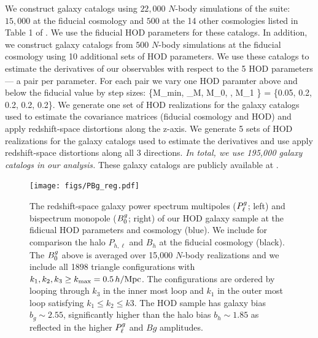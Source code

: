 We construct galaxy catalogs using $22,000$ $N$-body simulations of the \quij
suite: $15,000$ at the fiducial cosmology and $500$ at the 14 other cosmologies
listed in Table 1 of \cite{hahn2019}. We use the fiducial HOD parameters for
these catalogs. In addition, we construct galaxy catalogs from $500$ $N$-body
simulations at the fiducial cosmology using 10 additional sets of HOD
parameters. We use these catalogs to estimate the derivatives of our observables
with respect to the 5 HOD parameters --- a pair per parameter. For each pair we
vary one HOD paramter above and below the fiducial value by step sizes: 
\beq
\{\Delta M_{\rm min}, \Delta \sigma_{\log M}, \Delta \log M_0, \Delta \alpha,
\Delta \log M_1 \} = \{0.05, 0.2, 0.2, 0.2, 0.2\}.
\eeq
We generate one set of
HOD realizations for the galaxy catalogs used to estimate the covariance matrices
(fiducial cosmology and HOD) and apply redshift-space distortions along the
z-axis. We generate 5 sets of HOD realizations for the galaxy catalogs used to
estimate the derivatives and use apply redshift-space distortions along all
3 directions. {\em In total, we use 195,000 galaxy catalogs in our analysis.}
These galaxy catalogs are publicly available at .


\begin{figure}
\begin{center}
    \texttt{[image: figs/PBg\_reg.pdf]} 
    \caption{The redshift-space galaxy power spectrum multipoles ($P^g_{\ell}$; left)
    and bispectrum monopole ($B^g_0$; right) of our HOD galaxy sample at the
    fidicual HOD parameters and cosmology (blue). We include for comparison the
    halo $P_{h,\ell}$ and $B_{h}$ at the fiducial cosmology (black). The $B^g_0$
    above is averaged over 15,000 $N$-body realizations and we include all 1898
    triangle configurations with $k_1, k_2, k_3 \ge k_{\rm max} = 0.5\,h/\mathrm{Mpc}$.
    The configurations are ordered by looping through $k_3$ in the inner
    most loop and $k_1$ in the outer most loop satisfying $k_1 \le k_2 \le k3$.
    The HOD sample has galaxy bias $b_g\sim2.55$, significantly higher than the
    halo bias $b_h\sim1.85$ as reflected in the higher $P^g_{\ell}$ and $Bg$
    amplitudes.
    }
\label{fig:bgh}
\end{center}
\end{figure}
